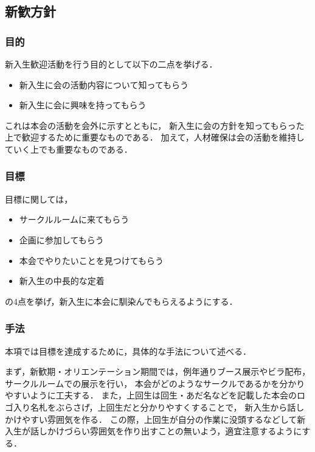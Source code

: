 \subsection*{新歓方針}


\subsubsection*{目的}
新入生歓迎活動を行う目的として以下の二点を挙げる．
\begin{itemize}
\item 新入生に会の活動内容について知ってもらう
\item 新入生に会に興味を持ってもらう
\end{itemize}
これは本会の活動を会外に示すとともに，
新入生に会の方針を知ってもらった上で歓迎するために重要なものである．
加えて，人材確保は会の活動を維持していく上でも重要なものである．

\subsubsection*{目標}
目標に関しては，
\begin{itemize}
\item サークルルームに来てもらう
\item 企画に参加してもらう
\item 本会でやりたいことを見つけてもらう
\item 新入生の中長的な定着
\end{itemize}
の4点を挙げ，新入生に本会に馴染んでもらえるようにする．

\subsubsection*{手法}
本項では目標を達成するために，具体的な手法について述べる．

まず，新歓期・オリエンテーション期間では，例年通りブース展示やビラ配布，サークルルームでの展示を行い，
本会がどのようなサークルであるかを分かりやすいように工夫する．
また，上回生は回生・あだ名などを記載した本会のロゴ入り名札をぶらさげ，上回生だと分かりやすくすることで，
新入生から話しかけやすい雰囲気を作る．
この際，上回生が自分の作業に没頭するなどして新入生が話しかけづらい雰囲気を作り出すことの無いよう，適宜注意するようにする．

